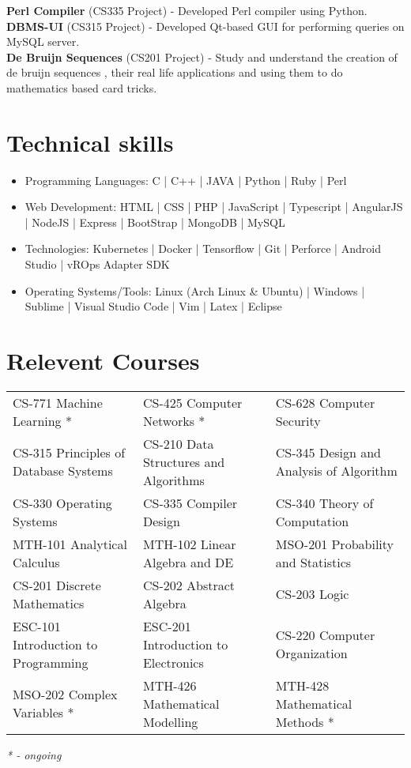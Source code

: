 \documentclass{article}
\begin{document}
\begin{flushleft}

	  \textbf{Perl Compiler} (CS335 Project) - Developed Perl compiler using Python.\\
	  \textbf{DBMS-UI} (CS315 Project) - Developed Qt-based GUI for performing queries on MySQL server.\\
      \textbf{De Bruijn Sequences} (CS201 Project) - Study and
understand the creation of de bruijn sequences , their real life
applications and using them to do mathematics based card tricks.
\end{flushleft}

\section{Technical skills}
\begin{itemize}
    \item  Programming Languages: C | C++ | JAVA | Python | Ruby | Perl
    \item  Web Development: HTML | CSS | PHP | JavaScript | Typescript | AngularJS | NodeJS | Express | BootStrap | MongoDB | MySQL
    \item  Technologies: Kubernetes | Docker | Tensorflow | Git | Perforce | Android Studio | vROps Adapter SDK
    \item  Operating Systems/Tools: Linux (Arch Linux \& Ubuntu) | Windows | Sublime | Visual Studio Code | Vim | Latex | Eclipse
\end{itemize}

\section{Relevent Courses}
\centering{}
\begin{tabular}{l|l|l}
CS-771 Machine Learning * & CS-425 Computer Networks * & CS-628 Computer Security \\
CS-315 Principles of Database Systems  & CS-210 Data Structures and Algorithms & CS-345 Design and Analysis of Algorithm\\
CS-330 Operating Systems & CS-335 Compiler Design & CS-340 Theory of Computation\\
MTH-101 Analytical Calculus & MTH-102 Linear Algebra and DE & MSO-201 Probability and Statistics \\
CS-201 Discrete Mathematics & CS-202 Abstract Algebra & CS-203 Logic \\
ESC-101 Introduction to Programming & ESC-201 Introduction to Electronics & CS-220 Computer Organization \\
MSO-202 Complex Variables * & MTH-426 Mathematical Modelling & MTH-428 Mathematical Methods *\\
\end{tabular}
\begin{flushright}
\textit{* - ongoing}
\end{flushright}
\end{document}
